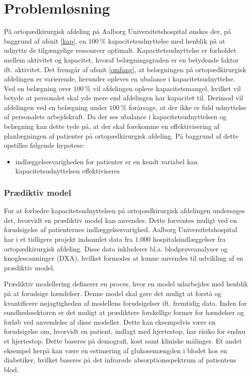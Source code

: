 \chapter{Problemløsning}
På ortopædkirurgisk afdeling på Aalborg Universitetshospital ønskes der, på baggrund af afsnit \ref{kap}, en $100~\%$ kapacitetsudnyttelse med henblik på at udnytte de tilgængelige ressourcer optimalt. Kapacitetsudnyttelse er forholdet mellem aktivitet og kapacitet, hvoraf belægningsgraden er en betydende faktor ift. aktivitet. Det fremgår af afsnit \ref{omfang}, at belægningen på ortopædkirurgisk afdelingen er varierende, herunder opleves en ubalance i kapacitetsudnyttelse. Ved en belægning over $100~\%$ vil afdelingen opleve kapacitetsmangel, hvilket vil betyde at personalet skal yde mere end afdelingen har kapacitet til. Derimod vil afdelingen ved en belægning under $100~\%$ forårsage, at der ikke er fuld udnyttelse af personalets arbejdskraft. Da der ses ubalance i kapacitetsudnyttelsen og belægning kan dette tyde på, at der skal forekomme en effektivisering af planlægningen af patienter på ortopædkirurgisk afdeling. På baggrund af dette opstilles følgende hypotese:

\noindent
\begin{itemize}
\item indlæggelsesvarigheden for patienter er en kendt variabel kan kapacitetsudnyttelsen effektiviseres
\end{itemize}

\subsection{Prædiktiv model}
For at forbedre kapacitetsudnyttelsen på ortopædkirurgisk afdelingen undersøges det, hvorvidt en prædiktiv model kan anvendes.
Dette forventes muligt ved en forudsigelse af patienternes indlæggelsesvarighed. Aalborg Universitetshospital har i et tidligere projekt indsamlet data fra $1.000$ hospitalsindlæggelser fra ortopædkirurgisk afdeling. Disse data inkluderer bl.a. blodprøveanalyser og knoglescanninger (DXA), hvilket formodes at kunne anvendes til udvikling af en prædiktiv model. 

\noindent
Prædiktiv modellering definerer en proces, hvor en model udarbejdes med henblik på at forudsige hændelser. Denne model skal gøre det muligt at forstå og kvantificere nøjagtigheden af modellens forudsigelser ift. fremtidig data.\cite{Kuhn2013} 
Inden for sundhedssektoren er det muligt at prædiktere forskellige former for hændelser og forløb ved anvendelse af disse modeller. Dette kan eksempelvis være en forudsigelse om, hvorvidt en patient, indlagt med hjertestop, har risiko for endnu et hjertestop. Dette baseres på demografi, kost samt kliniske målinger. Et andet eksempel herpå kan være en estimering af glukosemængden i blodet hos en diabetiker, hvilket baseres på det infrarøde absorptionsspektrum af patientens blod.\cite{Hastie2008}

